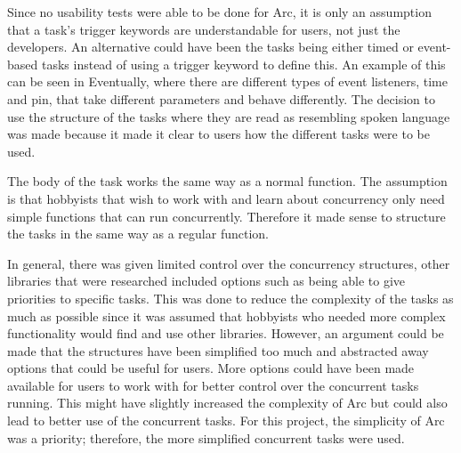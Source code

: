 Since no usability tests were able to be done for Arc, it is only an assumption that a task's trigger keywords are understandable for users, not just the developers. An alternative could have been the tasks being either timed or event-based tasks instead of using a trigger keyword to define this. An example of this can be seen in Eventually, where there are different types of event listeners, time and pin, that take different parameters and behave differently. The decision to use the structure of the tasks where they are read as resembling spoken language was made because it made it clear to users how the different tasks were to be used.





The body of the task works the same way as a normal function. The assumption is that hobbyists that wish to work with and learn about concurrency only need simple functions that can run concurrently. Therefore it made sense to structure the tasks in the same way as a regular function.

In general, there was given limited control over the concurrency structures, other libraries that were researched included options such as being able to give priorities to specific tasks. This was done to reduce the complexity of the tasks as much as possible since it was assumed that hobbyists who needed more complex functionality would find and use other libraries. However, an argument could be made that the structures have been simplified too much and abstracted away options that could be useful for users. More options could have been made available for users to work with for better control over the concurrent tasks running. This might have slightly increased the complexity of Arc but could also lead to better use of the concurrent tasks. For this project, the simplicity of Arc was a priority; therefore, the more simplified concurrent tasks were used.



